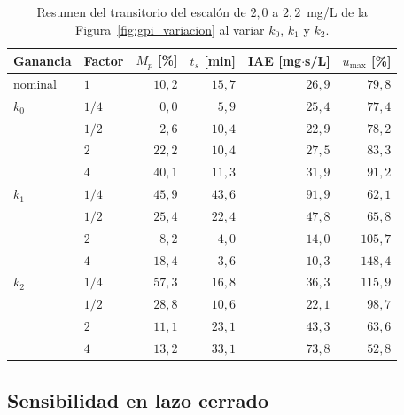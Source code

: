\begin{table}[H]
\centering
\caption[Resumen del transitorio del GPI al variar sus ganancias]{Resumen del
transitorio del escalón de $2{,}0$ a $2{,}2$~mg/L de la
Figura~\ref{fig:gpi_variacion} al variar $k_0$, $k_1$ y $k_2$.}
\label{tab:gpi_transitorio}
\small
\begin{tabular}{llrrrr}
\toprule
\textbf{Ganancia} & \textbf{Factor} & $M_p$ [\%] & $t_s$ [min] & IAE [mg$\cdot$s/L] & $u_{\max}$ [\%] \\
\midrule
nominal & $1$    & $10{,}2$  & $15{,}7$  & $26{,}9$ & $79{,}8$ \\
\midrule
$k_0$   & $1/4$  & $0{,}0$   & $5{,}9$   & $25{,}4$ & $77{,}4$ \\
        & $1/2$  & $2{,}6$   & $10{,}4$  & $22{,}9$ & $78{,}2$ \\
        & $2$    & $22{,}2$  & $10{,}4$  & $27{,}5$ & $83{,}3$ \\
        & $4$    & $40{,}1$  & $11{,}3$  & $31{,}9$ & $91{,}2$ \\
\midrule
$k_1$   & $1/4$  & $45{,}9$  & $43{,}6$  & $91{,}9$ & $62{,}1$ \\
        & $1/2$  & $25{,}4$  & $22{,}4$  & $47{,}8$ & $65{,}8$ \\
        & $2$    & $8{,}2$   & $4{,}0$   & $14{,}0$ & $105{,}7$ \\
        & $4$    & $18{,}4$  & $3{,}6$   & $10{,}3$ & $148{,}4$ \\
\midrule
$k_2$   & $1/4$  & $57{,}3$  & $16{,}8$  & $36{,}3$ & $115{,}9$ \\
        & $1/2$  & $28{,}8$  & $10{,}6$  & $22{,}1$ & $98{,}7$ \\
        & $2$    & $11{,}1$  & $23{,}1$  & $43{,}3$ & $63{,}6$ \\
        & $4$    & $13{,}2$  & $33{,}1$  & $73{,}8$ & $52{,}8$ \\
\bottomrule
\end{tabular}
\end{table}

\subsection{Sensibilidad en lazo cerrado}
\label{subsec:gpi_caso_sensibilidad}

